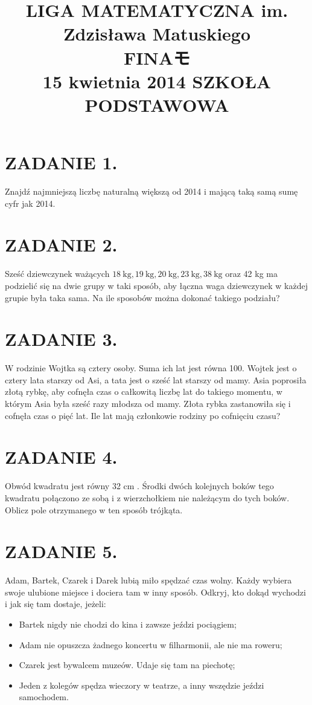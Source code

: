 \documentclass[10pt]{article}
\title{LIGA MATEMATYCZNA im. Zdzisława Matuskiego \\
 FINAモ \\
 15 kwietnia 2014 SZKOŁA PODSTAWOWA }
\author{}
\date{}
\begin{document}
\maketitle
\section*{ZADANIE 1.}
Znajdź najmniejszą liczbę naturalną większą od 2014 i mającą taką samą sumę cyfr jak 2014.

\section*{ZADANIE 2.}
Sześć dziewczynek ważących \(18 \mathrm{~kg}, 19 \mathrm{~kg}, 20 \mathrm{~kg}, 23 \mathrm{~kg}, 38 \mathrm{~kg}\) oraz 42 kg ma podzielić się na dwie grupy w taki sposób, aby łączna waga dziewczynek w każdej grupie była taka sama. Na ile sposobów można dokonać takiego podziału?

\section*{ZADANIE 3.}
W rodzinie Wojtka są cztery osoby. Suma ich lat jest równa 100. Wojtek jest o cztery lata starszy od Asi, a tata jest o sześć lat starszy od mamy. Asia poprosiła złotą rybkę, aby cofnęła czas o całkowitą liczbę lat do takiego momentu, w którym Asia była sześć razy młodsza od mamy. Złota rybka zastanowiła się i cofnęła czas o pięć lat. Ile lat mają członkowie rodziny po cofnięciu czasu?

\section*{ZADANIE 4.}
Obwód kwadratu jest równy 32 cm . Środki dwóch kolejnych boków tego kwadratu połączono ze sobą i z wierzchołkiem nie należącym do tych boków. Oblicz pole otrzymanego w ten sposób trójkąta.

\section*{ZADANIE 5.}
Adam, Bartek, Czarek i Darek lubią miło spędzać czas wolny. Każdy wybiera swoje ulubione miejsce i dociera tam w inny sposób. Odkryj, kto dokąd wychodzi i jak się tam dostaje, jeżeli:

\begin{itemize}
  \item Bartek nigdy nie chodzi do kina i zawsze jeździ pociągiem;
  \item Adam nie opuszcza żadnego koncertu w filharmonii, ale nie ma roweru;
  \item Czarek jest bywalcem muzeów. Udaje się tam na piechotę;
  \item Jeden z kolegów spędza wieczory w teatrze, a inny wszędzie jeździ samochodem.
\end{itemize}
\end{document}

